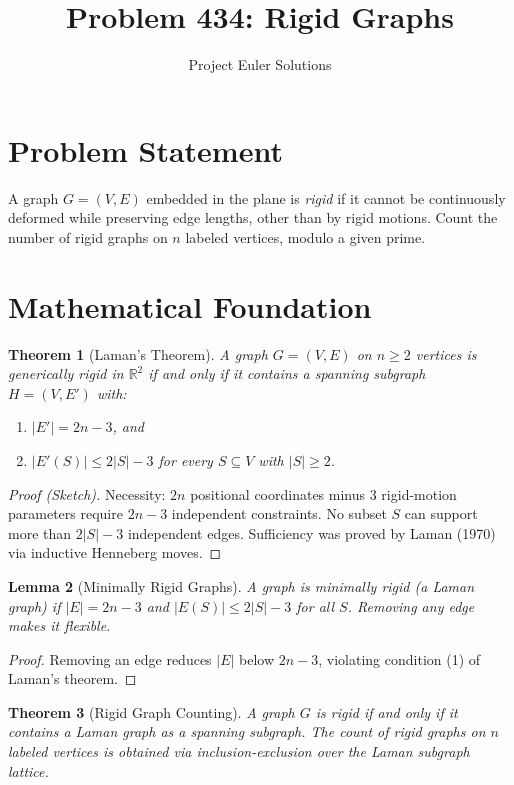 \documentclass[11pt]{article}
\title{Problem 434: Rigid Graphs}
\author{Project Euler Solutions}
\date{}
\newtheorem{theorem}{Theorem}
\newtheorem{lemma}[theorem]{Lemma}
\begin{document}
\maketitle

\section{Problem Statement}
A graph $G = (V, E)$ embedded in the plane is \emph{rigid} if it cannot be continuously deformed while preserving edge lengths, other than by rigid motions. Count the number of rigid graphs on $n$ labeled vertices, modulo a given prime.

\section{Mathematical Foundation}

\begin{theorem}[Laman's Theorem]
A graph $G = (V, E)$ on $n \geq 2$ vertices is generically rigid in $\mathbb{R}^2$ if and only if it contains a spanning subgraph $H = (V, E')$ with:
\begin{enumerate}
    \item $|E'| = 2n - 3$, and
    \item $|E'(S)| \leq 2|S| - 3$ for every $S \subseteq V$ with $|S| \geq 2$.
\end{enumerate}
\end{theorem}

\begin{proof}[Proof (Sketch)]
Necessity: $2n$ positional coordinates minus 3 rigid-motion parameters require $2n - 3$ independent constraints. No subset $S$ can support more than $2|S| - 3$ independent edges. Sufficiency was proved by Laman (1970) via inductive Henneberg moves.
\end{proof}

\begin{lemma}[Minimally Rigid Graphs]
A graph is minimally rigid (a Laman graph) if $|E| = 2n - 3$ and $|E(S)| \leq 2|S| - 3$ for all $S$. Removing any edge makes it flexible.
\end{lemma}

\begin{proof}
Removing an edge reduces $|E|$ below $2n - 3$, violating condition (1) of Laman's theorem.
\end{proof}

\begin{theorem}[Rigid Graph Counting]
A graph $G$ is rigid if and only if it contains a Laman graph as a spanning subgraph. The count of rigid graphs on $n$ labeled vertices is obtained via inclusion-exclusion over the Laman subgraph lattice.
\end{theorem}
\end{document}
